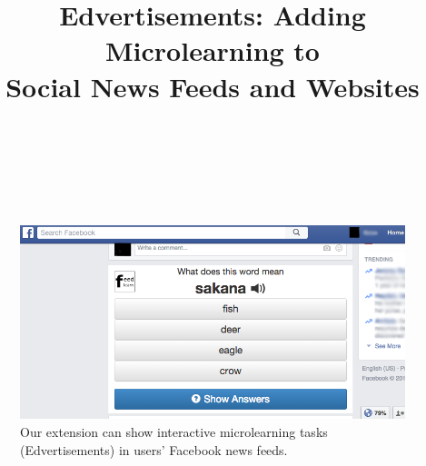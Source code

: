 \documentclass{sigchi}
\begin{document}
\title{Edvertisements: Adding Microlearning to \\ Social News Feeds and Websites}

\author{%
  \\
  \\
  \\
}

\maketitle


\begin{figure}
\includegraphics[width=\columnwidth]{feedlearn-screenshot.png}
\caption{Our extension can show interactive microlearning tasks (Edvertisements) in users' Facebook news feeds.}
\label{fig:feedlearn}
\end{figure}
\end{document}
